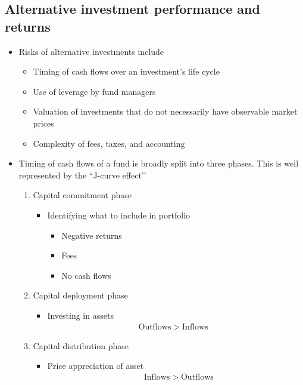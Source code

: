 \documentclass[../notes_compiled.tex]{subfiles}
\begin{document}
\subsection{Alternative investment performance and returns}
\begin{itemize}
\item Risks of alternative investments include
\begin{itemize}
\item Timing of cash flows over an investment’s life cycle
\item Use of leverage by fund managers
\item Valuation of investments that do not necessarily have observable market prices
\item Complexity of fees, taxes, and accounting
\end{itemize}
\item Timing of cash flows of a fund is broadly split into three phases. This is well represented by the ``J-curve effect’’
\begin{enumerate}
\item Capital commitment phase
\begin{itemize}
\item Identifying what to include in portfolio
\begin{itemize}
\item Negative returns
\item Fees
\item No cash flows
\end{itemize}
\end{itemize}
\item Capital deployment phase
\begin{itemize}
\item Investing in assets
\begin{gather*}
\phantom{In}\text{Outflows}>\text{Inflows}\phantom{Out}
\end{gather*}
\end{itemize}
\item Capital distribution phase
\begin{itemize}
\item Price appreciation of asset
\begin{gather*}
\phantom{Out}\text{Inflows}>\text{Outflows}\phantom{In}
\end{gather*}
\end{itemize}
\end{enumerate}
\vspace{-.5cm}
\begin{figure}[h]

\end{figure}
\end{itemize}
\end{document}
